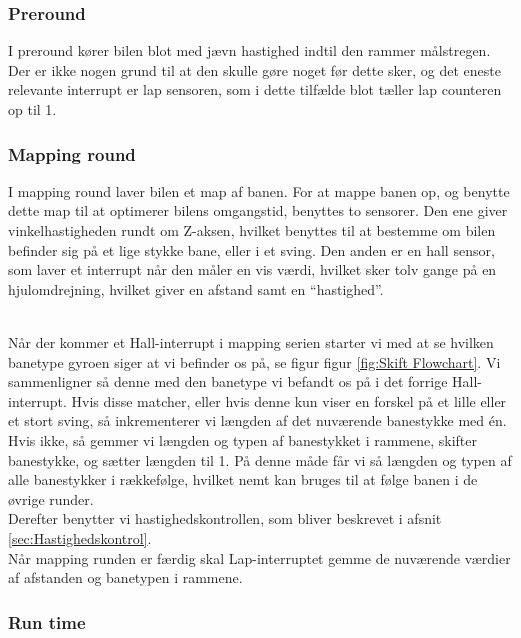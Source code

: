 \subsubsection{Preround}
I preround kører bilen blot med jævn hastighed indtil den rammer målstregen. Der er ikke nogen grund til at den skulle gøre noget før dette sker, og det eneste relevante interrupt er lap sensoren, som i dette tilfælde blot tæller lap counteren op til 1.

\subsubsection{Mapping round}
I mapping round laver bilen et map af banen. For at mappe banen op, og benytte dette map til at optimerer bilens omgangstid, benyttes to sensorer. Den ene giver vinkelhastigheden rundt om Z-aksen, hvilket benyttes til at bestemme om bilen befinder sig på et lige stykke bane, eller i et sving. Den anden er en hall sensor, som laver et interrupt når den måler en vis værdi, hvilket sker tolv gange på en hjulomdrejning, hvilket giver en afstand samt en ``hastighed''.
\\\


Når der kommer et Hall-interrupt i mapping serien starter vi med at se hvilken banetype gyroen siger at vi befinder os på, se figur figur \ref{fig:Skift Flowchart}. Vi sammenligner så denne med den banetype vi befandt os på i det forrige Hall-interrupt. Hvis disse matcher, eller hvis denne kun viser en forskel på et lille eller et stort sving, så inkrementerer vi længden af det nuværende banestykke med én. Hvis ikke, så gemmer vi længden og typen af banestykket i rammene, skifter banestykke, og sætter længden til 1. På denne måde får vi så længden og typen af alle banestykker i rækkefølge, hvilket nemt kan bruges til at følge banen i de øvrige runder.
\\
Derefter benytter vi hastighedskontrollen, som bliver beskrevet i afsnit \ref{sec:Hastighedskontrol}.
\\
Når mapping runden er færdig skal Lap-interruptet gemme de nuværende værdier af afstanden og banetypen i rammene. 

\subsubsection{Run time}

